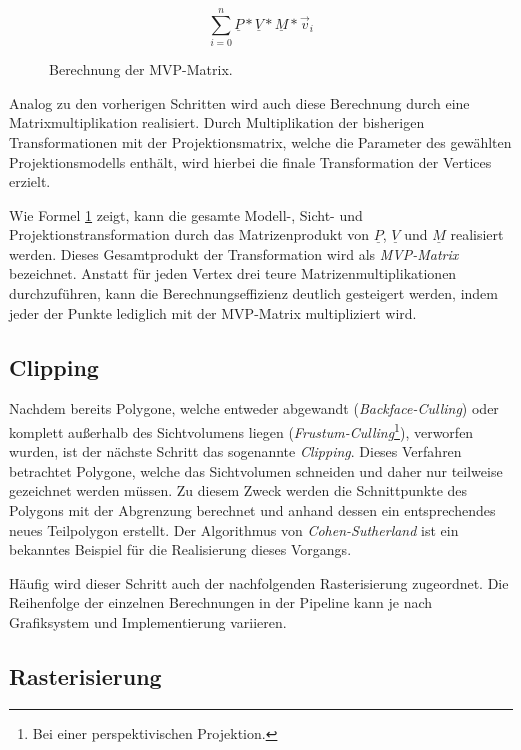 \begin{figure}[!h]
	\begin{displaymath}
		\sum_{i=0}^{n} \underline{P} * \underline{V} * \underline{M} * \vec{v}_i
	\end{displaymath}
	\caption{Berechnung der MVP-Matrix.}
	\label{CALC:MVP_MATRIX}
\end{figure}

Analog zu den vorherigen Schritten wird auch diese Berechnung durch eine Matrixmultiplikation realisiert. Durch Multiplikation der bisherigen Transformationen mit der Projektionsmatrix, welche die Parameter des gewählten Projektionsmodells enthält, wird hierbei die finale Transformation der Vertices erzielt.

Wie Formel \ref{CALC:MVP_MATRIX} zeigt, kann die gesamte Modell-, Sicht- und Projektionstransformation durch das Matrizenprodukt von $\underline{P}$, $\underline{V}$ und $\underline{M}$ realisiert werden. Dieses Gesamtprodukt der Transformation wird als \emph{MVP-Matrix} bezeichnet. Anstatt für jeden Vertex drei teure Matrizenmultiplikationen durchzuführen, kann die Berechnungseffizienz deutlich gesteigert werden, indem jeder der Punkte lediglich mit der MVP-Matrix multipliziert wird.

\subsection{Clipping}

Nachdem bereits Polygone, welche entweder abgewandt (\emph{Backface-Culling}) oder komplett außerhalb des Sichtvolumens liegen (\emph{Frustum-Culling}\footnote{Bei einer perspektivischen Projektion.}), verworfen wurden, ist der nächste Schritt das sogenannte \emph{Clipping}. Dieses Verfahren betrachtet Polygone, welche das Sichtvolumen schneiden und daher nur teilweise gezeichnet werden müssen. Zu diesem Zweck werden die Schnittpunkte des Polygons mit der Abgrenzung berechnet und anhand dessen ein entsprechendes neues Teilpolygon erstellt. Der Algorithmus von \emph{Cohen-Sutherland} ist ein bekanntes Beispiel für die Realisierung dieses Vorgangs.

Häufig wird dieser Schritt auch der nachfolgenden Rasterisierung zugeordnet. Die Reihenfolge der einzelnen Berechnungen in der Pipeline kann je nach Grafiksystem und Implementierung variieren.

\subsection{Rasterisierung}

